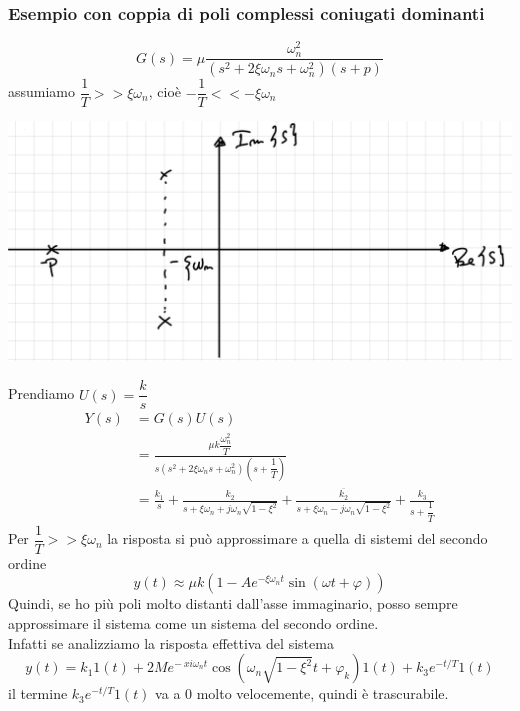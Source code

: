 \documentclass{article}
\numberwithin{equation}{subsection}
\begin{document}
\subsubsection{Esempio con coppia di poli complessi coniugati dominanti} 
\[
    G(s) = \mu \frac{\omega_n^2}{(s^2+2\xi\omega_n s +\omega_n^2)(s+p)}
\]
assumiamo $\dfrac{1}{T} >> \xi \omega_n$, cioè $-\dfrac{1}{T} << - \xi \omega_n$
\begin{center}
    \includegraphics[scale=0.22]{Images/Esempio_polo_dominante.png}
\end{center}
Prendiamo $U(s) = \dfrac{k}{s}$
\begin{align*}
    Y(s) 
    &= G(s) U(s)\\
    &=\frac{\mu k \dfrac{\omega_n^2}{T}}{s(s^2+2\xi\omega_ns + \omega_n^2)\left(s+\dfrac{1}{T}\right)}\\
    &= \frac{k_1}{s} + \frac{k_2}{s+\xi\omega_n+j\omega_n \sqrt{1-\xi^2}} + \frac{\overline{k_2}}{s+\xi\omega_n-j\omega_n \sqrt{1-\xi^2}} + \frac{k_3}{s+\dfrac{1}{T}}
\end{align*}
Per $\dfrac{1}{T} >> \xi \omega_n$ la risposta si può approssimare a quella di sistemi del secondo ordine
\[
    y(t) \approx \mu k \left(1-A e^{-\xi \omega_n t} \sin(\omega t + \varphi)\right)
\]
Quindi, se ho più poli molto distanti dall'asse immaginario, posso sempre approssimare il sistema come un sistema del secondo ordine.
\vspace*{0.2cm}\\
Infatti se analizziamo la risposta effettiva del sistema
\[
    y(t) = k_1 1(t) + 2M e^{-\ xi \omega_n t} \cos(\omega_n \sqrt{1 - \xi^2}t + \varphi_k) 1(t) + k_3 e^{-t/T} 1(t)
\]
il termine $k_3 e^{-t/T} 1(t)$ va a 0 molto velocemente, quindi è trascurabile.
\end{document}
